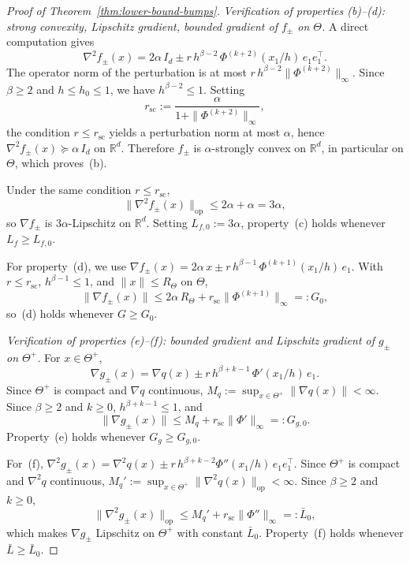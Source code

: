 \documentclass{article}
\renewcommand{\leq}{\leqslant}
\renewcommand{\geq}{\geqslant}
\theoremstyle{definition}
\begin{document}
\begin{proof}[Proof of Theorem~\ref{thm:lower-bound-bumps}]
\medskip
\noindent\textit{Verification of properties (b)--(d): strong convexity, Lipschitz gradient, bounded gradient of $f_\pm$ on $\Theta$.}
A direct computation gives
\begin{equation}
\label{eq:lb-Hessfpm}
\nabla^2 f_\pm(x)=2\alpha\,I_d
\pm r\,h^{\beta-2}\,\Phi^{(k+2)}(x_1/h)\,e_1 e_1^\top.
\end{equation}
The operator norm of the perturbation is at most 
$r\,h^{\beta-2}\|\Phi^{(k+2)}\|_\infty$. Since $\beta\geq 2$ and 
$h\leq h_0\leq 1$, we have $h^{\beta-2}\leq 1$. Setting
\begin{equation}
\label{eq:lb-rsc}
r_{\mathrm{sc}}:=\frac{\alpha}{1+\|\Phi^{(k+2)}\|_\infty},
\end{equation}
the condition $r\leq r_{\mathrm{sc}}$ yields a perturbation norm 
at most $\alpha$, hence $\nabla^2 f_\pm(x)\succeq\alpha\,I_d$ on 
$\mathbb{R}^d$. Therefore $f_\pm$ is $\alpha$-strongly convex on 
$\mathbb{R}^d$, in particular on $\Theta$, which proves~(b).

Under the same condition $r\leq r_{\mathrm{sc}}$,
\[
\|\nabla^2 f_\pm(x)\|_{\mathrm{op}}\leq 2\alpha+\alpha=3\alpha,
\]
so $\nabla f_\pm$ is $3\alpha$-Lipschitz on $\mathbb{R}^d$. 
Setting $L_{f,0}:=3\alpha$, property~(c) holds whenever 
$L_f\geq L_{f,0}$.

For property~(d), we use 
$\nabla f_\pm(x)=2\alpha\,x\pm r\,h^{\beta-1}\,
\Phi^{(k+1)}(x_1/h)\,e_1$. With $r\leq r_{\mathrm{sc}}$, 
$h^{\beta-1}\leq 1$, and $\|x\|\leq R_\Theta$ on $\Theta$,
\[
\|\nabla f_\pm(x)\|
\leq 2\alpha\,R_\Theta+r_{\mathrm{sc}}\|\Phi^{(k+1)}\|_\infty=:G_0,
\]
so~(d) holds whenever $G\geq G_0$.

\medskip
\noindent\textit{Verification of properties (e)--(f): bounded gradient and Lipschitz gradient of $g_\pm$ on $\Theta^+$.}
For $x\in\Theta^+$,
\[
\nabla g_\pm(x)=\nabla q(x)
\pm r\,h^{\beta+k-1}\,\Phi'(x_1/h)\,e_1.
\]
Since $\Theta^+$ is compact and $\nabla q$ continuous, 
$M_q:=\sup_{x\in\Theta^+}\|\nabla q(x)\|<\infty$. Since 
$\beta\geq 2$ and $k\geq 0$, $h^{\beta+k-1}\leq 1$, and 
\[
\|\nabla g_\pm(x)\|\leq M_q+r_{\mathrm{sc}}\|\Phi'\|_\infty
=:G_{g,0}.
\]
Property~(e) holds whenever $G_g\geq G_{g,0}$.

For~(f), 
$\nabla^2 g_\pm(x)=\nabla^2 q(x)\pm r\,h^{\beta+k-2}
\Phi''(x_1/h)\,e_1 e_1^\top$. Since $\Theta^+$ is compact and 
$\nabla^2 q$ continuous, $M_q':=\sup_{x\in\Theta^+}
\|\nabla^2 q(x)\|_{\mathrm{op}}<\infty$. Since $\beta\geq 2$ 
and $k\geq 0$,
\[
\|\nabla^2 g_\pm(x)\|_{\mathrm{op}}
\leq M_q'+r_{\mathrm{sc}}\|\Phi''\|_\infty=:\bar{L}_0,
\]
which makes $\nabla g_\pm$ Lipschitz on $\Theta^+$ with constant 
$\bar{L}_0$. Property~(f) holds whenever $\bar{L}\geq\bar{L}_0$.


\end{proof}
\end{document}

